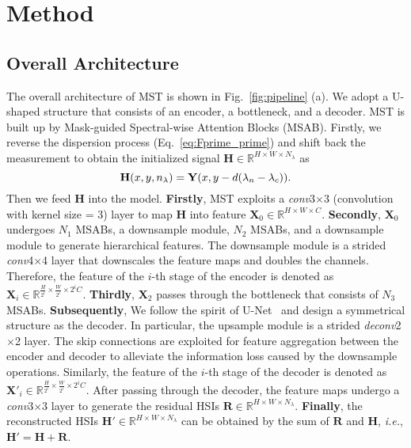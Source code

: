 \documentclass[10pt,twocolumn,letterpaper]{article}
\begin{document}
\vspace{-0.5mm}
\section{Method}
\vspace{-0.1mm}
\subsection{Overall Architecture}
\vspace{-0.5mm}
The overall architecture of MST is shown in Fig.~\ref{fig:pipeline} (a). We adopt a U-shaped structure that consists of an encoder, a bottleneck, and a decoder. MST is built up by Mask-guided Spectral-wise Attention Blocks (MSAB).  Firstly, we reverse the dispersion process (Eq.~\eqref{eq:Fprime_prime})  and shift back the measurement to obtain the initialized signal $\mathbf{H} \in \mathbb{R}^{H\times W \times N_{\lambda}}$ as
\vspace{-1.2mm}
\begin{equation}
\mathbf{H}(x,y,n_\lambda) = \mathbf{Y}(x,y-d(\lambda_n-\lambda_c)).
\vspace{-1.2mm}
\label{shift_back}
\end{equation} 
Then we feed $\mathbf{H}$ into the model.  \textbf{Firstly}, MST exploits a \emph{conv}3$\times$3 (convolution with kernel size = 3) layer to map $\mathbf{H}$ into feature $\mathbf{X}_0 \in  \mathbb{R}^{H\times W \times C}$. \textbf{Secondly}, $\mathbf{X}_0$ undergoes  $N_1$ MSABs, a downsample module, $N_2$ MSABs, and a downsample module to generate hierarchical features. The downsample module is a strided \emph{conv}4$\times$4 layer that downscales the feature maps and doubles the channels. Therefore, the feature of the $i$-th stage of the encoder is denoted as $\mathbf{X}_i \in \mathbb{R}^{\frac{H}{2^i} \times \frac{W}{2^i}  \times 2^{i}C}$. \textbf{Thirdly}, $\mathbf{X}_2$ passes through the bottleneck that consists of $N_3$ MSABs. \textbf{Subsequently}, We follow the spirit of U-Net~\cite{unet} and design a symmetrical structure as the decoder.  In particular, the upsample module is  a strided \emph{deconv}2$\times$2 layer. The skip connections are exploited for feature aggregation between the encoder and decoder to alleviate the information loss caused by the downsample operations. Similarly, the feature of the $i$-th stage of the decoder is denoted as $\mathbf{X}'_i \in \mathbb{R}^{\frac{H}{2^i} \times \frac{W}{2^i}  \times 2^{i}C}$. After passing through the decoder, the feature maps undergo a \emph{conv}3$\times$3 layer to generate the residual HSIs $\mathbf{R} \in \mathbb{R}^{H\times W \times N_{\lambda}}$. \textbf{Finally}, the reconstructed HSIs $\mathbf{H}' \in \mathbb{R}^{H\times W \times N_{\lambda}}$  can be obtained by the sum of $\mathbf{R}$ and $\mathbf{H}$, \emph{i.e.}, $\mathbf{H}' = \mathbf{H} + \mathbf{R}$.
\end{document}
